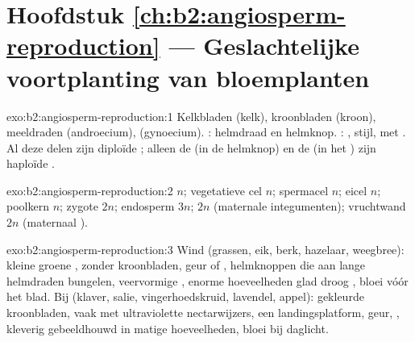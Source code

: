 \section*{Hoofdstuk \ref{ch:b2:angiosperm-reproduction} --- Geslachtelijke voortplanting van bloemplanten}

\begin{solution}{exo:b2:angiosperm-reproduction:1}
Kelkbladen (kelk), kroonbladen (kroon), meeldraden (androecium),
 (gynoecium). : helmdraad en helmknop. :
, stijl,  met . Al deze delen zijn
diploïde ; alleen de  (in de helmknop) en de
 (in het ) zijn haploïde .
\end{solution}

\begin{solution}{exo:b2:angiosperm-reproduction:2}
 $n$; vegetatieve cel $n$; spermacel $n$; eicel $n$; poolkern
$n$; zygote $2n$; endosperm $3n$;  $2n$ (maternale
integumenten); vruchtwand $2n$ (maternaal ).
\end{solution}

\begin{solution}{exo:b2:angiosperm-reproduction:3}
Wind (grassen, eik, berk, hazelaar, weegbree): kleine groene ,
zonder kroonbladen, geur of , helmknoppen die aan lange helmdraden
bungelen, veervormige , enorme hoeveelheden glad droog ,
bloei vóór het blad. Bij (klaver, salie, vingerhoedskruid, lavendel,
appel): gekleurde kroonbladen, vaak met ultraviolette nectarwijzers, een
landingsplatform, geur, , kleverig gebeeldhouwd  in matige
hoeveelheden, bloei bij daglicht.
\end{solution}

